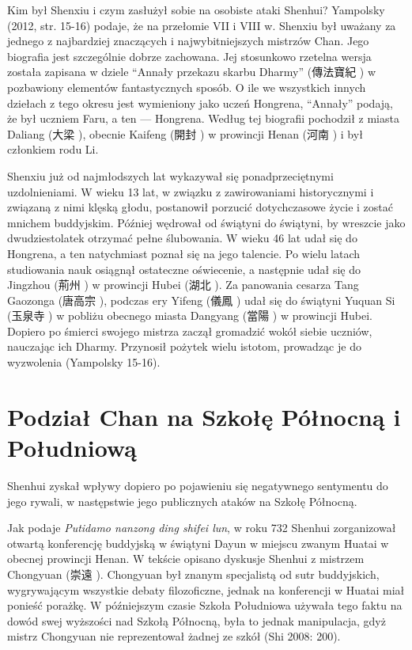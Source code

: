 Kim był Shenxiu i czym zasłużył sobie na osobiste ataki Shenhui? Yampolsky (2012, str. 15-16) podaje, że na przełomie VII i VIII w. Shenxiu był uważany za jednego z najbardziej znaczących i najwybitniejszych mistrzów Chan.
Jego biografia jest szczególnie dobrze zachowana. Jej stosunkowo rzetelna wersja została zapisana w dziele ``Annały przekazu skarbu Dharmy'' (傳法寶紀 ) w pozbawiony elementów fantastycznych sposób.
O ile we wszystkich innych dziełach z tego okresu jest wymieniony jako uczeń Hongrena, ``Annały'' podają, że był uczniem Faru, a ten --- Hongrena. Według tej biografii pochodził z miasta Daliang (大梁 ), obecnie Kaifeng (開封 ) w prowincji Henan (河南 ) i był członkiem rodu Li.

Shenxiu już od najmłodszych lat wykazywał się ponadprzeciętnymi uzdolnieniami.
W wieku 13 lat, w związku z zawirowaniami historycznymi i związaną z nimi klęską głodu, postanowił porzucić dotychczasowe życie i zostać mnichem buddyjskim.
Później wędrował od świątyni do świątyni, by wreszcie jako dwudziestolatek otrzymać pełne ślubowania.
W wieku 46 lat udał się do Hongrena, a ten natychmiast poznał się na jego talencie.
Po wielu latach studiowania nauk osiągnął ostateczne oświecenie, a następnie udał się do Jingzhou (荊州 ) w prowincji Hubei (湖北 ).
Za panowania cesarza Tang Gaozonga (唐高宗 ), podczas ery Yifeng (儀鳳 ) udał się do świątyni Yuquan Si (玉泉寺 ) w pobliżu obecnego miasta Dangyang (當陽 ) w prowincji Hubei.
Dopiero po śmierci swojego mistrza zaczął gromadzić wokół siebie uczniów, nauczając ich Dharmy. Przynosił pożytek wielu istotom, prowadząc je do wyzwolenia
(Yampolsky 15-16).
\fi

\section{Podział Chan na Szkołę Północną i Południową}
Shenhui zyskał wpływy dopiero po pojawieniu się negatywnego sentymentu do jego rywali, w następstwie jego publicznych ataków na Szkołę Północną.

Jak podaje \textit{Putidamo nanzong ding shifei lun}, w roku 732 Shenhui zorganizował otwartą konferencję buddyjską w świątyni Dayun w miejscu zwanym Huatai w obecnej prowincji Henan.\label{Huatai}
W tekście opisano dyskusje Shenhui z mistrzem Chongyuan (崇遠 ).
Chongyuan był znanym specjalistą od sutr buddyjskich, wygrywającym wszystkie debaty filozoficzne, jednak na konferencji w Huatai miał ponieść porażkę.
W późniejszym czasie Szkoła Południowa używała tego faktu na dowód swej wyższości nad Szkołą Północną, była to jednak manipulacja, gdyż mistrz Chongyuan nie reprezentował żadnej ze szkół
(Shi 2008: 200).

